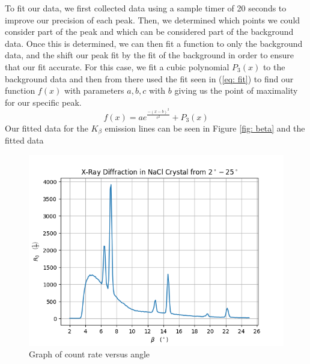 \documentclass[twocolumn]{article}
\begin{document}
			To fit our data, we first collected data using a sample timer of 20 seconds to improve our precision of each peak. Then, we determined which points we could consider part of the peak and which can be considered part of the background data. Once this is determined, we can then fit a function to only the background data, and the shift our peak fit by the fit of the background in order to ensure that our fit accurate. For this case, we fit a cubic polynomial $P_3(x)$ to the background data and then from there used the fit seen in (\ref{eq: fit}) to find our function $f(x)$ with parameters $a, b, c$ with $b$ giving us the point of maximality for our specific peak.
			\begin{equation}
				f(x) = ae^{\frac{-(x-b)^2}{c^2}} + P_3(x) \label{eq: fit}
			\end{equation}	
			Our fitted data for the $K_\beta$ emission lines can be seen in Figure \ref{fig: beta} and the fitted data 
			\begin{figure}
				\centering
				\includegraphics[width = .5\textwidth]{../Graphs/FullData}
				\caption{Graph of count rate versus angle }
				\label{fulldata}
			\end{figure}
			
\end{document}
